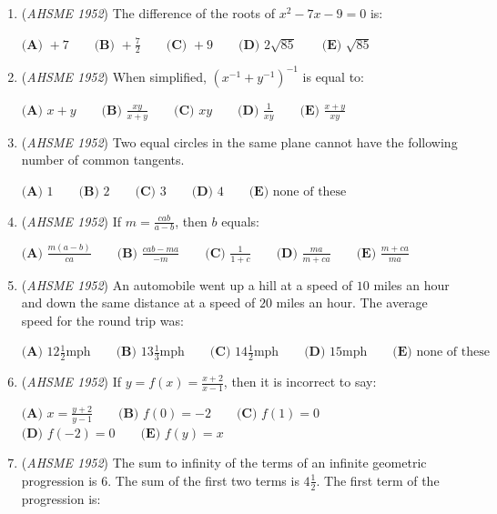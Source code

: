 \begin{enumerate}
	\item (\textit{AHSME 1952}) The difference of the roots of $x^2-7x-9=0$ is:


 $\textbf{(A) \ }+7  \qquad \textbf{(B) \ }+\frac{7}{2} \qquad \textbf{(C) \ }+9 \qquad \textbf{(D) \ }2\sqrt{85} \qquad \textbf{(E) \ }\sqrt{85}$


	\item (\textit{AHSME 1952}) When simplified, $(x^{-1}+y^{-1})^{-1}$ is equal to:


 $\textbf{(A) \ }x+y  \qquad \textbf{(B) \ }\frac{xy}{x+y} \qquad \textbf{(C) \ }xy \qquad \textbf{(D) \ }\frac{1}{xy} \qquad \textbf{(E) \ }\frac{x+y}{xy}$


	\item (\textit{AHSME 1952}) Two equal circles in the same plane cannot have the following number of common tangents.


 $\textbf{(A) \ }1  \qquad \textbf{(B) \ }2 \qquad \textbf{(C) \ }3 \qquad \textbf{(D) \ }4 \qquad \textbf{(E) \ }\text{none of these}$


	\item (\textit{AHSME 1952}) If $m=\frac{cab}{a-b}$, then $b$ equals:


 $\textbf{(A) \ }\frac{m(a-b)}{ca}  \qquad \textbf{(B) \ }\frac{cab-ma}{-m} \qquad \textbf{(C) \ }\frac{1}{1+c} \qquad \textbf{(D) \ }\frac{ma}{m+ca} \qquad \textbf{(E) \ }\frac{m+ca}{ma}$


	\item (\textit{AHSME 1952}) An automobile went up a hill at a speed of $10$ miles an hour and down the same distance at a speed of $20$ miles an hour. The average speed for the round trip was:


 $\textbf{(A) \ }12\frac{1}{2}\text{mph}  \qquad \textbf{(B) \ }13\frac{1}{3}\text{mph} \qquad \textbf{(C) \ }14\frac{1}{2}\text{mph} \qquad \textbf{(D) \ }15\text{mph} \qquad \textbf{(E) \ }\text{none of these}$


	\item (\textit{AHSME 1952}) If $y=f(x)=\frac{x+2}{x-1}$, then it is incorrect to say:


 $\textbf{(A)\ }x=\frac{y+2}{y-1}\qquad\textbf{(B)\ }f(0)=-2\qquad\textbf{(C)\ }f(1)=0\qquad$
$\textbf{(D)\ }f(-2)=0\qquad\textbf{(E)\ }f(y)=x$


	\item (\textit{AHSME 1952}) The sum to infinity of the terms of an infinite geometric progression is $6$. The sum of the first two terms is $4\frac{1}{2}$. The first term of the progression is:



\end{enumerate}
